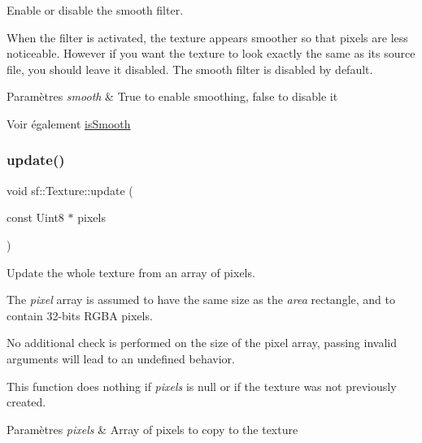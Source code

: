 Enable or disable the smooth filter. 

When the filter is activated, the texture appears smoother so that pixels are less noticeable. However if you want the texture to look exactly the same as its source file, you should leave it disabled. The smooth filter is disabled by default.


\begin{DoxyParams}{Paramètres}
{\em smooth} & True to enable smoothing, false to disable it\\
\hline
\end{DoxyParams}
\begin{DoxySeeAlso}{Voir également}
\hyperlink{classsf_1_1Texture_a3ebb050b5a71e1d40ba66eb1a060e103}{is\+Smooth} 
\end{DoxySeeAlso}
\mbox{\label{classsf_1_1Texture_ae4eab5c6781316840b0c50ad08370963}} 
\subsubsection{\texorpdfstring{update()}{update()}\hspace{0.1cm}{\footnotesize\ttfamily [1/6]}}
{\footnotesize\ttfamily void sf\+::\+Texture\+::update (\begin{DoxyParamCaption}\item[{const Uint8 $\ast$}]{pixels }\end{DoxyParamCaption})}



Update the whole texture from an array of pixels. 

The {\itshape pixel} array is assumed to have the same size as the {\itshape area} rectangle, and to contain 32-\/bits R\+G\+BA pixels.

No additional check is performed on the size of the pixel array, passing invalid arguments will lead to an undefined behavior.

This function does nothing if {\itshape pixels} is null or if the texture was not previously created.


\begin{DoxyParams}{Paramètres}
{\em pixels} & Array of pixels to copy to the texture \\
\hline
\end{DoxyParams}
\mbox{\label{classsf_1_1Texture_a1352d8e16c2aeb4df586ed65dd2c36b9}} 
